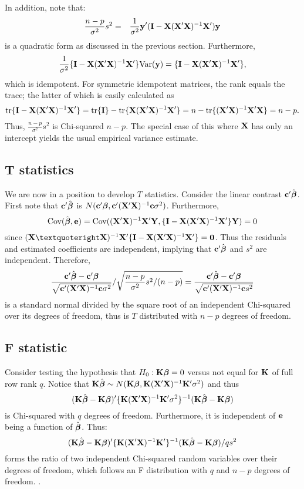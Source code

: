In addition, note that:
\begin{eqnarray*}
\frac{n-p}{\sigma^2} s^2 & = & \frac{1}{\sigma^2}\mathbf{y}' (\mathbf{I} - \mathbf{X} (\mathbf{X}' \mathbf{X})^{-1} \mathbf{X}') \mathbf{y} 
\end{eqnarray*}
is a quadratic form as discussed in the previous section.  
Furthermore,
$$
\frac{1}{\sigma^2}\{\mathbf{I} - \mathbf{X} (\mathbf{X}' \mathbf{X})^{-1} \mathbf{X}'\} \mbox{Var}(\mathbf{y}) = \{\mathbf{I} - \mathbf{X} (\mathbf{X}' \mathbf{X})^{-1} \mathbf{X}'\},
$$
which is idempotent. For symmetric idempotent matrices, the rank equals
the trace; the latter of which is easily calculated as
$$
\mbox{tr}\{\mathbf{I} - \mathbf{X} (\mathbf{X}' \mathbf{X})^{-1} \mathbf{X}'\} = \mbox{tr}\{\mathbf{I}\} - \mbox{tr}\{\mathbf{X} (\mathbf{X}' \mathbf{X})^{-1} \mathbf{X}'\}
= n - \mbox{tr}\{ (\mathbf{X}' \mathbf{X})^{-1} \mathbf{X}' \mathbf{X}\} = n - p.
$$
Thus, $\frac{n-p}{\sigma^2} s^2$ is Chi-squared $n-p$. The special
case of this where $\mathbf{X}$ has only an intercept yields the usual
empirical variance estimate.



\subsection{T statistics}


We are now in a position to develop $T$ statistics.
Consider the linear contrast $\mathbf{c}' \hat {\boldsymbol{\beta}}$. First note that
$\mathbf{c}' \hat {\boldsymbol{\beta}}$ is $N(\mathbf{c}' \boldsymbol{\beta}, \mathbf{c}' (\mathbf{X}' \mathbf{X})^{-1} \mathbf{c} \sigma^2)$. 
Furthermore,
$$\mbox{Cov}(\hat {\boldsymbol{\beta}}, \mathbf{e}) = \mbox{Cov}((\mathbf{X}' \mathbf{X})^{-1}  \mathbf{X}' \mathbf{Y}, \{\mathbf{I} - \mathbf{X} (\mathbf{X}' \mathbf{X})^{-1} \mathbf{X}' \} \mathbf{Y}) = 0$$
since $\xtxinv \bX' \{\bI - \bfX (\bfX' \bfX)^{-1} \bfX'\} = \bzero$. Thus the residuals
and estimated coefficients are independent, implying that $\mathbf{c}'\hat {\boldsymbol{\beta}}$
and $s^2$ are independent.
Therefore,
$$
\frac{\mathbf{c}' \hat {\boldsymbol{\beta}} - \mathbf{c}' \boldsymbol{\beta} }{\sqrt{\mathbf{c}' (\mathbf{X}' \mathbf{X})^{-1} \mathbf{c} \sigma^2}}
/ \sqrt{\frac{n-p}{\sigma^2} s^2 / (n-p)}
=\frac{\mathbf{c}' \hat {\boldsymbol{\beta}} - \mathbf{c}'\boldsymbol{\beta}}{\sqrt{\mathbf{c}' (\mathbf{X}' \mathbf{X})^{-1} \mathbf{c} s^2}}
$$
is a standard normal divided by the square root of an independent Chi-squared
over its degrees of freedom, thus is $T$ distributed with $n-p$ degrees of freedom.

\subsection{F statistic}

\label{sec:ftest}
Consider testing the hypothesis that $H_0:\mathbf{K} \boldsymbol{\beta} = 0$ versus not equal for $\mathbf{K}$
of full row rank $q$. 
Notice that $\mathbf{K} \hat {\boldsymbol{\beta}} \sim N(\mathbf{K} \boldsymbol{\beta}, \mathbf{K} (\mathbf{X}' \mathbf{X})^{-1} \mathbf{K}' \sigma^2)$ and thus
$$
(\mathbf{K} \hat {\boldsymbol{\beta}} - \mathbf{K} \boldsymbol{\beta})'  \{\mathbf{K} (\mathbf{X}' \mathbf{X})^{-1} \mathbf{K}' \sigma^2 \}^{-1} (\mathbf{K} \hat {\boldsymbol{\beta}} - \mathbf{K} \boldsymbol{\beta})
$$
is Chi-squared with $q$ degrees of freedom. Furthermore, it is independent of
$\mathbf{e}$ being a function of $\hat {\boldsymbol{\beta}}$. Thus:
$$
(\mathbf{K} \hat {\boldsymbol{\beta}} - \mathbf{K} \boldsymbol{\beta})'  \{\mathbf{K} (\mathbf{X}' \mathbf{X})^{-1} \mathbf{K}'\}^{-1} (\mathbf{K} \hat {\boldsymbol{\beta}} - \mathbf{K} \boldsymbol{\beta}) / q s^2
$$
forms the ratio of two independent Chi-squared random variables over their degrees of freedom, which follows an F distribution with $q$ and $n-p$ degrees of freedom. . 



